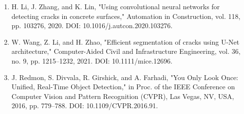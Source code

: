 \documentclass[12pt,a4paper]{article}
\begin{document}
\begin{thebibliography}{99}
\begin{enumerate}
    \item H. Li, J. Zhang, and K. Lin, "Using convolutional neural networks for detecting cracks in concrete surfaces," Automation in Construction, vol. 118, pp. 103276, 2020. DOI: 10.1016/j.autcon.2020.103276.
    
    \item W. Wang, Z. Li, and H. Zhao, "Efficient segmentation of cracks using U-Net architecture," Computer-Aided Civil and Infrastructure Engineering, vol. 36, no. 9, pp. 1215–1232, 2021. DOI: 10.1111/mice.12696.
    
    \item J. Redmon, S. Divvala, R. Girshick, and A. Farhadi, "You Only Look Once: Unified, Real-Time Object Detection," in Proc. of the IEEE Conference on Computer Vision and Pattern Recognition (CVPR), Las Vegas, NV, USA, 2016, pp. 779–788. DOI: 10.1109/CVPR.2016.91.
    
\end{enumerate}
\end{thebibliography}
\end{document}
